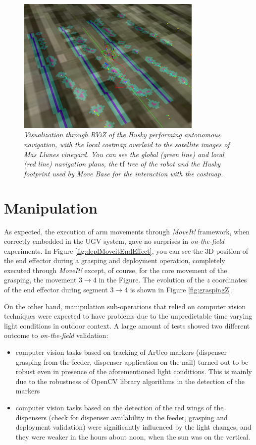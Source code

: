 \begin{figure}
	\centering
	\includegraphics[width=0.8\textwidth]{Images/experimental_data/navigation2_gimped.png}
	\caption{\textit{Visualization through RViZ of the Husky performing autonomous navigation, with the local costmap overlaid to the satellite images of Mas Llunes vineyard. You can see the global (green line) and local (red line) navigation plans, the} tf \textit{tree of the robot and the Husky footprint used by Move Base for the interaction with the costmap.}}
	\label{fig:result_navigation}
\end{figure}


\section{Manipulation}

As expected, the execution of arm movements through \textit{MoveIt!} framework, when correctly embedded in the \ac{UGV} system, gave no surprises in \textit{on-the-field} experiments. In Figure \ref{fig:deplMoveitEndEffect}, you can see the 3D position of the end effector during a grasping and deployment operation, completely executed through \textit{MoveIt!} except, of course, for the core movement of the grasping, the movement 3$\rightarrow$4 in the Figure. The evolution of the $z$ coordinates of the end effector during segment 3$\rightarrow$4 is shown in Figure \ref{fig:graspingZ}.

On the other hand, manipulation sub-operations that relied on computer vision techniques were expected to have problems due to the unpredictable time varying light conditions in outdoor context. A large amount of tests showed two different outcome to \textit{on-the-field} validation:
\begin{itemize}
	\item computer vision tasks based on tracking of ArUco markers (dispenser grasping from the feeder, dispenser application on the nail) turned out to be robust even in presence of the aforementioned light conditions. This is mainly due to the robustness of OpenCV library algorithms in the detection of the markers
	\item computer vision tasks based on the detection of the red wings of the dispensers (check for dispenser availability in the feeder, grasping and deployment validation) were significantly influenced by the light changes, and they were weaker in the hours about noon, when the sun was on the vertical.
\end{itemize}


